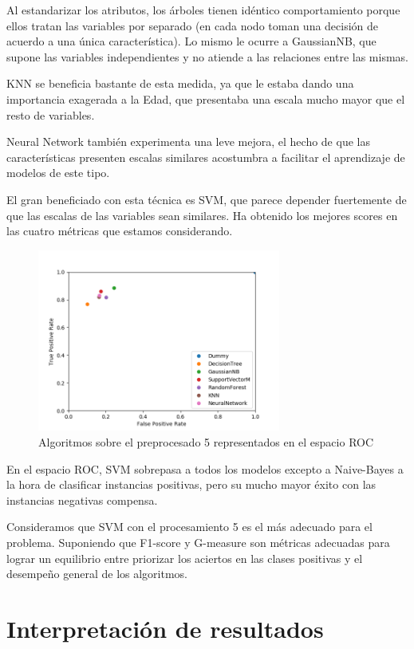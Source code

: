 \documentclass{article}
\begin{document}
Al estandarizar los atributos, los árboles tienen idéntico
comportamiento porque ellos tratan las variables por separado (en cada
nodo toman una decisión de acuerdo a una única característica). Lo
mismo le ocurre a GaussianNB, que supone las variables independientes
y no atiende a las relaciones entre las mismas.

KNN se beneficia bastante de esta medida, ya que le estaba dando una
importancia exagerada a la Edad, que presentaba una escala mucho mayor
que el resto de variables.

Neural Network también experimenta una leve mejora, el hecho de que
las características presenten escalas similares acostumbra a facilitar
el aprendizaje de modelos de este tipo.

El gran beneficiado con esta técnica es SVM, que parece depender
fuertemente de que las escalas de las variables sean similares. Ha
obtenido los mejores scores en las cuatro métricas que estamos
considerando.

\begin{figure}[H]
  \centering
  \label{fig:roc5}
  \caption{Algoritmos sobre el preprocesado 5 representados en el espacio ROC}
  \includegraphics[width=80mm]{figures/roc5}
\end{figure}

En el espacio ROC, SVM sobrepasa a todos los modelos excepto a
Naive-Bayes a la hora de clasificar instancias positivas, pero su
mucho mayor éxito con las instancias negativas compensa.

Consideramos que SVM con el procesamiento 5 es el más adecuado para el
problema. Suponiendo que F1-score y G-measure son métricas adecuadas
para lograr un equilibrio entre priorizar los aciertos en las clases
positivas y el desempeño general de los algoritmos.

\section{Interpretación de resultados}
\end{document}
